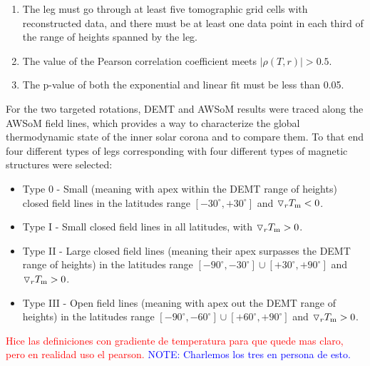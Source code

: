 \documentclass[namedreferences]{solarphysics}
\newcommand{\mdeg}{^\circ}
\newcommand{\dr}{\triangledown_r}
\newcommand{\Tm}{T_{\rm m}}
\newcommand{\rhoTr}{\rho(T,r)}
\def\diego#1{\textcolor{red}{#1}}
\def\temp#1{\textcolor{gray}{#1}}
\def\notebyalbert#1{\textcolor{blue}{NOTE: #1}}
\begin{document}
\begin{article}
\begin{enumerate}
\item 
The leg must go through at least five tomographic grid cells with reconstructed data, and there must be at least one data point in each third of the range of heights spanned by the leg.

\item 
The {value of the Pearson correlation coefficient meets $|\rhoTr| > 0.5$.}

\item 
The p-value of both the exponential and linear fit must be less than 0.05.

\end{enumerate}


For the two targeted rotations, DEMT and AWSoM results were traced along the AWSoM field lines, which provides a way to characterize the global thermodynamic state of the inner solar corona and to compare them. To that end four different types of {legs} corresponding with four different types of magnetic structures were selected:

\begin{itemize}
 \item Type 0 - Small (meaning with apex within the DEMT range of heights) closed field lines in the latitudes range $[-30\mdeg,+30\mdeg]$ and $\dr \Tm < 0$. %

\item  Type I - Small closed field lines in all latitudes, with $\dr \Tm > 0$. %

\item  Type II - Large closed field lines (meaning their apex surpasses the DEMT range of heights) in the latitudes range $[-90\mdeg,-30\mdeg] \cup [+30\mdeg,+90\mdeg]$ and $\dr \Tm > 0$. %

\item Type III - Open field lines (meaning with apex out the DEMT range of heights) in the latitudes range $[-90\mdeg,-60\mdeg] \cup [+60\mdeg,+90\mdeg]$ and $\dr \Tm > 0$.

\end{itemize}
\diego{Hice las definiciones con gradiente de temperatura para que quede mas claro, pero en realidad uso el pearson.} \notebyalbert{Charlemos los tres en persona de esto.}


\end{article}
\end{document}

